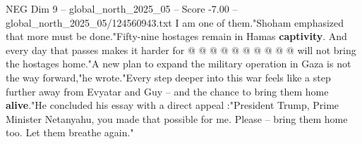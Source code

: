 \begin{textsample}{NEG Dim 9 – global\_north\_2025\_05 – Score -7.00 – global\_north\_2025\_05/124560943.txt}
I am one of them."Shoham emphasized that more must be done."Fifty-nine hostages remain in Hamas \textbf{captivity}.
And every day that passes makes it harder for @ @ @ @ @ @ @ @ @ @ will not bring the hostages home."A new plan to expand the military operation in Gaza is not the way forward,"he wrote."Every step deeper into this war feels like a step further away from Evyatar and Guy -- and the chance to bring them home \textbf{alive}."He concluded his essay with a direct appeal :"President Trump, Prime Minister Netanyahu, you made that possible for me.
Please -- bring them home too.
Let them breathe again."

\end{textsample}
